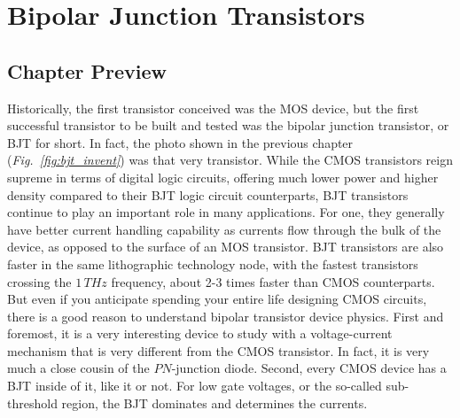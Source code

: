 \chapter{Bipolar Junction Transistors}
\label{ch:ch11_bjt}
\graphicspath{{./figs_bjt/}}
\section{Chapter Preview}
Historically, the first transistor conceived was the MOS device, but the first successful transistor to be built and tested was the bipolar junction transistor, or BJT for short.  In fact, the photo shown in the previous chapter (\emph{Fig.~\ref{fig:bjt_invent}}) was that very transistor.  While the CMOS transistors reign supreme in terms of digital logic circuits, offering much lower power and higher density compared to their BJT logic circuit counterparts, BJT transistors continue to play an important role in many applications.  For one, they generally have better current handling capability as currents flow through the bulk of the device, as opposed to the surface of an MOS transistor.  BJT transistors are also faster in the same lithographic technology node, with the fastest transistors crossing the $1\,THz$ frequency, about 2-3 times faster than CMOS counterparts.  But even if you anticipate spending your entire life designing CMOS circuits, there is a good reason to understand bipolar transistor device physics.  First and foremost, it is a very interesting device to study with a voltage-current mechanism that is very different from the CMOS transistor.  In fact, it is very much a close cousin of the $PN$-junction diode.  Second, every CMOS device has a BJT inside of it, like it or not.  For low gate voltages, or the so-called sub-threshold region, the BJT dominates and determines the currents.  

